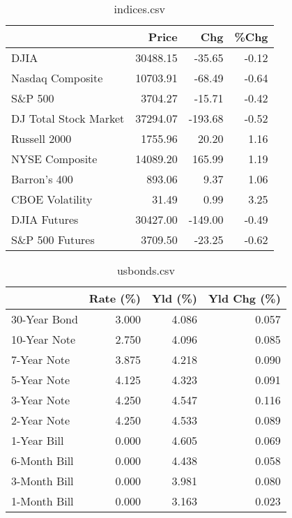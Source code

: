 \documentclass{article}%
\begin{document}
%


\begin{table}[htbp]%
\caption{indices.csv}%
\centering%
\begin{adjustbox}{width=1\textwidth}%
\begin{tabular}{lrrr}
\toprule
                      &    Price &     Chg &  \%Chg \\
\midrule
                 DJIA & 30488.15 &  -35.65 & -0.12 \\
     Nasdaq Composite & 10703.91 &  -68.49 & -0.64 \\
              S\&P 500 &  3704.27 &  -15.71 & -0.42 \\
DJ Total Stock Market & 37294.07 & -193.68 & -0.52 \\
         Russell 2000 &  1755.96 &   20.20 &  1.16 \\
       NYSE Composite & 14089.20 &  165.99 &  1.19 \\
         Barron's 400 &   893.06 &    9.37 &  1.06 \\
      CBOE Volatility &    31.49 &    0.99 &  3.25 \\
         DJIA Futures & 30427.00 & -149.00 & -0.49 \\
      S\&P 500 Futures &  3709.50 &  -23.25 & -0.62 \\
\bottomrule
\end{tabular}
%
\end{adjustbox}%
\end{table}

%


\begin{table}[htbp]%
\caption{usbonds.csv}%
\centering%
\begin{adjustbox}{width=1\textwidth}%
\begin{tabular}{lrrr}
\toprule
             &  Rate (\%) &  Yld (\%) &  Yld Chg (\%) \\
\midrule
30-Year Bond &     3.000 &    4.086 &        0.057 \\
10-Year Note &     2.750 &    4.096 &        0.085 \\
 7-Year Note &     3.875 &    4.218 &        0.090 \\
 5-Year Note &     4.125 &    4.323 &        0.091 \\
 3-Year Note &     4.250 &    4.547 &        0.116 \\
 2-Year Note &     4.250 &    4.533 &        0.089 \\
 1-Year Bill &     0.000 &    4.605 &        0.069 \\
6-Month Bill &     0.000 &    4.438 &        0.058 \\
3-Month Bill &     0.000 &    3.981 &        0.080 \\
1-Month Bill &     0.000 &    3.163 &        0.023 \\
\bottomrule
\end{tabular}
%
\end{adjustbox}%
\end{table}
\end{document}
